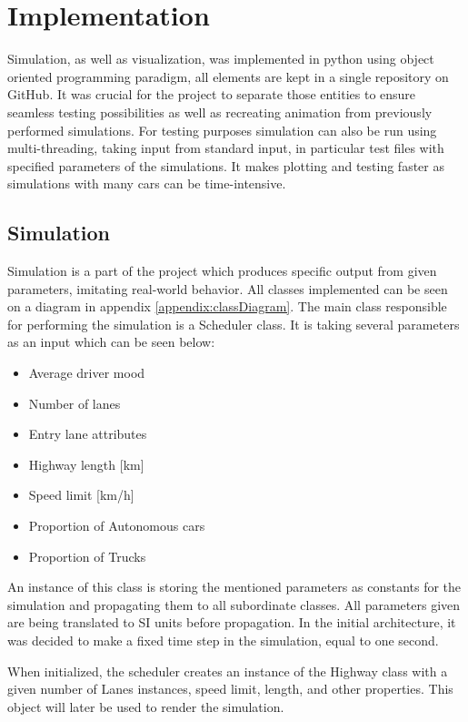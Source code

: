 \section{Implementation}
Simulation, as well as visualization, was implemented in python using object oriented programming paradigm, all elements are kept in a single repository on GitHub\cite{repository}. It was crucial for the project to separate those entities to ensure seamless testing possibilities as well as recreating animation from previously performed simulations. For testing purposes simulation can also be run using multi-threading, taking input from standard input, in particular test files with specified parameters of the simulations. It makes plotting and testing faster as simulations with many cars can be time-intensive.

\subsection{Simulation}
Simulation is a part of the project which produces specific output from given parameters, imitating real-world behavior. All classes implemented can be seen on a diagram in appendix \ref{appendix:classDiagram}. The main class responsible for performing the simulation is a Scheduler class. It is taking several parameters as an input which can be seen below:

\begin{itemize}
    \item Average driver mood
    \item Number of lanes
    \item Entry lane attributes
    \item Highway length [km]
    \item Speed limit [km/h]
    \item Proportion of Autonomous cars
    \item Proportion of Trucks
\end{itemize}

An instance of this class is storing the mentioned parameters as constants for the simulation and propagating them to all subordinate classes. All parameters given are being translated to SI units before propagation. In the initial architecture, it was decided to make a fixed time step in the simulation, equal to one second.

When initialized, the scheduler creates an instance of the Highway class with a given number of Lanes instances, speed limit, length, and other properties. This object will later be used to render the simulation.


